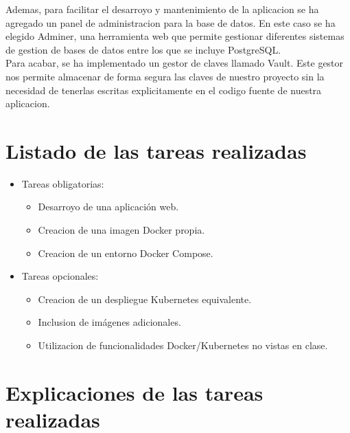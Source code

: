 \documentclass{report}
\begin{document}
        Ademas, para facilitar el desarroyo y mantenimiento de la aplicacion se ha agregado un panel de administracion para la base de datos.
        En este caso se ha elegido Adminer, una herramienta web que permite gestionar diferentes sistemas de gestion de bases de datos entre los que se incluye PostgreSQL.\\

        Para acabar, se ha implementado un gestor de claves llamado Vault. Este gestor nos permite almacenar de forma segura las claves de nuestro proyecto sin la necesidad de tenerlas escritas explicitamente en el codigo fuente de nuestra aplicacion.
    \chapter{Listado de las tareas realizadas}
        \begin{itemize}
            \item Tareas obligatorias:
            \begin{itemize}
                \item Desarroyo de una aplicación web. \checkmark
                \item Creacion de una imagen Docker propia. \checkmark
                \item Creacion de un entorno Docker Compose. \checkmark
            \end{itemize}
            \item Tareas opcionales:
            \begin{itemize}
                \item Creacion de un despliegue Kubernetes equivalente. \checkmark
                \item Inclusion de imágenes adicionales. \checkmark
                \item Utilizacion de funcionalidades Docker/Kubernetes no vistas en clase.
            \end{itemize}
        \end{itemize}
    \chapter{Explicaciones de las tareas realizadas}
\end{document}
